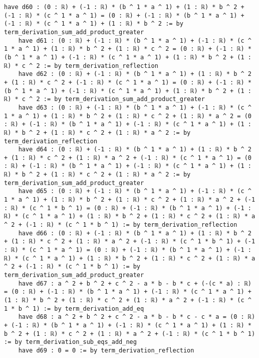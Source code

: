 \documentclass{article}
\begin{document}
\begin{tcolorbox}[colback=white!10, width=\linewidth]
\begin{lstlisting}[language=Lean4]
    have d60 : (0 : ℝ) + (-1 : ℝ) * (b ^ 1 * a ^ 1) + (1 : ℝ) * b ^ 2 + (-1 : ℝ) * (c ^ 1 * a ^ 1) = (0 : ℝ) + (-1 : ℝ) * (b ^ 1 * a ^ 1) + (-1 : ℝ) * (c ^ 1 * a ^ 1) + (1 : ℝ) * b ^ 2 := by term_derivation_sum_add_product_greater
    have d61 : (0 : ℝ) + (-1 : ℝ) * (b ^ 1 * a ^ 1) + (-1 : ℝ) * (c ^ 1 * a ^ 1) + (1 : ℝ) * b ^ 2 + (1 : ℝ) * c ^ 2 = (0 : ℝ) + (-1 : ℝ) * (b ^ 1 * a ^ 1) + (-1 : ℝ) * (c ^ 1 * a ^ 1) + (1 : ℝ) * b ^ 2 + (1 : ℝ) * c ^ 2 := by term_derivation_reflection
    have d62 : (0 : ℝ) + (-1 : ℝ) * (b ^ 1 * a ^ 1) + (1 : ℝ) * b ^ 2 + (1 : ℝ) * c ^ 2 + (-1 : ℝ) * (c ^ 1 * a ^ 1) = (0 : ℝ) + (-1 : ℝ) * (b ^ 1 * a ^ 1) + (-1 : ℝ) * (c ^ 1 * a ^ 1) + (1 : ℝ) * b ^ 2 + (1 : ℝ) * c ^ 2 := by term_derivation_sum_add_product_greater
    have d63 : (0 : ℝ) + (-1 : ℝ) * (b ^ 1 * a ^ 1) + (-1 : ℝ) * (c ^ 1 * a ^ 1) + (1 : ℝ) * b ^ 2 + (1 : ℝ) * c ^ 2 + (1 : ℝ) * a ^ 2 = (0 : ℝ) + (-1 : ℝ) * (b ^ 1 * a ^ 1) + (-1 : ℝ) * (c ^ 1 * a ^ 1) + (1 : ℝ) * b ^ 2 + (1 : ℝ) * c ^ 2 + (1 : ℝ) * a ^ 2 := by term_derivation_reflection
    have d64 : (0 : ℝ) + (-1 : ℝ) * (b ^ 1 * a ^ 1) + (1 : ℝ) * b ^ 2 + (1 : ℝ) * c ^ 2 + (1 : ℝ) * a ^ 2 + (-1 : ℝ) * (c ^ 1 * a ^ 1) = (0 : ℝ) + (-1 : ℝ) * (b ^ 1 * a ^ 1) + (-1 : ℝ) * (c ^ 1 * a ^ 1) + (1 : ℝ) * b ^ 2 + (1 : ℝ) * c ^ 2 + (1 : ℝ) * a ^ 2 := by term_derivation_sum_add_product_greater
    have d65 : (0 : ℝ) + (-1 : ℝ) * (b ^ 1 * a ^ 1) + (-1 : ℝ) * (c ^ 1 * a ^ 1) + (1 : ℝ) * b ^ 2 + (1 : ℝ) * c ^ 2 + (1 : ℝ) * a ^ 2 + (-1 : ℝ) * (c ^ 1 * b ^ 1) = (0 : ℝ) + (-1 : ℝ) * (b ^ 1 * a ^ 1) + (-1 : ℝ) * (c ^ 1 * a ^ 1) + (1 : ℝ) * b ^ 2 + (1 : ℝ) * c ^ 2 + (1 : ℝ) * a ^ 2 + (-1 : ℝ) * (c ^ 1 * b ^ 1) := by term_derivation_reflection
    have d66 : (0 : ℝ) + (-1 : ℝ) * (b ^ 1 * a ^ 1) + (1 : ℝ) * b ^ 2 + (1 : ℝ) * c ^ 2 + (1 : ℝ) * a ^ 2 + (-1 : ℝ) * (c ^ 1 * b ^ 1) + (-1 : ℝ) * (c ^ 1 * a ^ 1) = (0 : ℝ) + (-1 : ℝ) * (b ^ 1 * a ^ 1) + (-1 : ℝ) * (c ^ 1 * a ^ 1) + (1 : ℝ) * b ^ 2 + (1 : ℝ) * c ^ 2 + (1 : ℝ) * a ^ 2 + (-1 : ℝ) * (c ^ 1 * b ^ 1) := by term_derivation_sum_add_product_greater
    have d67 : a ^ 2 + b ^ 2 + c ^ 2 - a * b - b * c + (-(c * a) : ℝ) = (0 : ℝ) + (-1 : ℝ) * (b ^ 1 * a ^ 1) + (-1 : ℝ) * (c ^ 1 * a ^ 1) + (1 : ℝ) * b ^ 2 + (1 : ℝ) * c ^ 2 + (1 : ℝ) * a ^ 2 + (-1 : ℝ) * (c ^ 1 * b ^ 1) := by term_derivation_add_eq
    have d68 : a ^ 2 + b ^ 2 + c ^ 2 - a * b - b * c - c * a = (0 : ℝ) + (-1 : ℝ) * (b ^ 1 * a ^ 1) + (-1 : ℝ) * (c ^ 1 * a ^ 1) + (1 : ℝ) * b ^ 2 + (1 : ℝ) * c ^ 2 + (1 : ℝ) * a ^ 2 + (-1 : ℝ) * (c ^ 1 * b ^ 1) := by term_derivation_sub_eqs_add_neg
    have d69 : 0 = 0 := by term_derivation_reflection

\end{lstlisting}
\end{tcolorbox}
\end{document}
